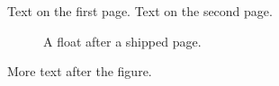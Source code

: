 \documentclass{article}
\begin{document}
Text on the first page.
\newpage
Text on the second page.

\begin{figure}[t]
\centering
\fbox{\rule{0pt}{2cm}\hspace{4cm}}
\caption{A float after a shipped page.}
\end{figure}

More text after the figure.
\end{document}
